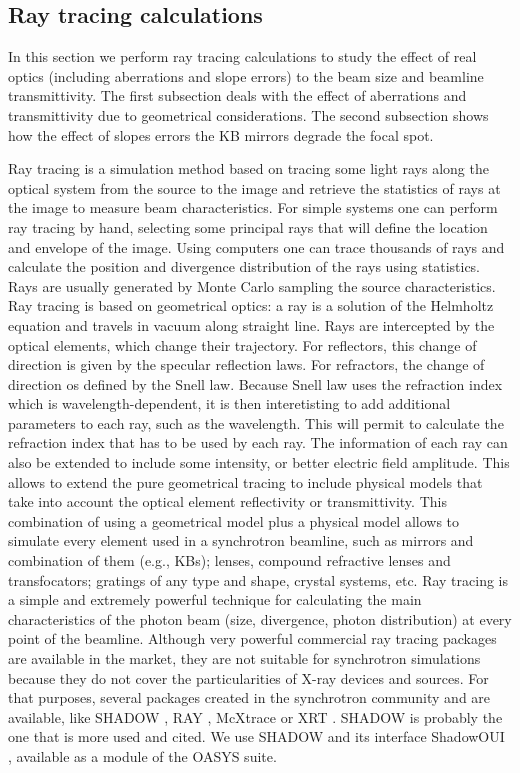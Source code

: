 \documentclass{iucr}              %
\begin{document}
\subsection{Ray tracing calculations}
\label{level1}

In this section we perform ray tracing calculations to study the effect of real optics (including aberrations and slope errors) to the beam size and beamline transmittivity. The first subsection deals with the effect of aberrations and transmittivity due to geometrical considerations. The second subsection shows how the effect of slopes errors the KB mirrors degrade the focal spot.  

Ray tracing is a simulation method based on tracing some light rays along the optical system from the source to the image and retrieve the statistics of rays at the image to measure beam characteristics. For simple systems one can perform ray tracing by hand, selecting some principal rays that will define the location and envelope of the image. Using computers one can trace thousands of rays and calculate the position and divergence distribution of the rays using statistics. Rays are usually generated by Monte Carlo sampling the source characteristics. Ray tracing is based on geometrical optics: a ray is a solution of the Helmholtz equation and travels in vacuum along straight line. Rays are intercepted by the optical elements, which change their trajectory. For reflectors, this change of direction is given by the specular reflection laws. For refractors, the change of direction os defined by the Snell law. Because Snell law uses the refraction index which is wavelength-dependent, it is then interetisting to add additional parameters to each ray, such as the wavelength. This will permit to calculate the refraction index that has to be used by each ray. The information of each ray can also be extended to include some intensity, or better electric field amplitude. This allows to extend the pure geometrical tracing to include physical models that take into account the optical element reflectivity or transmittivity. This combination of using a geometrical model plus a physical model allows to simulate every element used in a synchrotron beamline, such as mirrors and combination of them (e.g., KBs); lenses, compound refractive lenses and transfocators; gratings of any type and shape, crystal systems, etc. Ray tracing is a simple and extremely powerful technique for calculating the main characteristics of the photon beam (size, divergence, photon distribution) at every point of the beamline. Although very powerful commercial ray tracing packages are available in the market, they are not suitable for synchrotron simulations because they do not cover the particularities of X-ray devices and sources. For that purposes, several packages created in the synchrotron community and are available, like SHADOW \cite{codeSHADOW}, RAY \cite{codeRAY}, McXtrace \cite{codeMCXTRACE} or XRT \cite{codeXRT}. SHADOW is probably the one that is more used and cited. We use SHADOW and its interface ShadowOUI \cite{codeSHADOWOUI}, available as a module of the OASYS suite.
\end{document}
